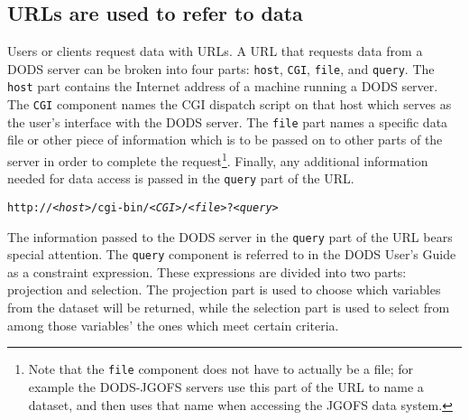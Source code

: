 \documentclass[12pt]{article}
\begin{document}
\subsection{URLs are used to refer to data}
\label{url}

Users or clients request data with \acs{URL}s. A \acs{URL} that requests data
from a \ac{DODS} server can be broken into four
parts: {\tt host}, {\tt CGI}, {\tt file}, and {\tt query}. The {\tt host}
part contains the Internet address of a machine running a \ac{DODS} server.
The {\tt CGI} component names the CGI dispatch script on that host which
serves as the user's interface with the \ac{DODS} server. The {\tt file} part
names a specific data file or other piece of information which is to be
passed on to other parts of the server in order to complete the 
request\footnote{Note
that the {\tt file} component does not have to actually be a file; for
example the \ac{DODS}-JGOFS servers use this part of the \acs{URL} to name a
dataset, and then uses that name when accessing the JGOFS data system.}.
Finally, any additional information needed for data access is passed in the
{\tt query} part of the \acs{URL}.

\begin{alltt}
    http://\emph{<host>}/cgi-bin/\emph{<CGI>}/\emph{<file>}?\emph{<query>}
\end{alltt}

The information passed to the \ac{DODS} server in the {\tt query} part of the
\acs{URL} bears special attention. The {\tt query} component is referred to
in the \ac{DODS} User's Guide \cite{dods:users-guide} as a constraint
expression. These expressions are divided into two parts: projection and
selection. The projection part is used to choose which variables from the
dataset will be returned, while the selection part is used to select from
among those variables' the ones which  meet certain criteria.
\end{document}

